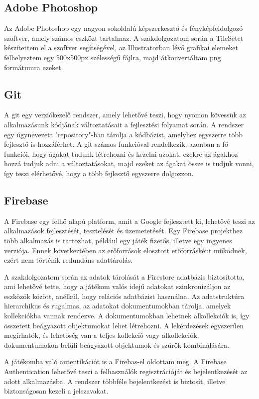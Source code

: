 \documentclass[12pt, a4paper]{report}
\theoremstyle{definition}
\begin{document}
	\subsection{Adobe Photoshop}
	Az Adobe Photoshop egy nagyon sokoldalú képszerkesztő és fényképfeldolgozó szoftver, amely számos eszközt tartalmaz. A szakdolgozatom során a TileSetet készítettem el a szoftver segítségével, az Illustratorban lévő grafikai elemeket felhelyeztem egy 500x500px szélességű fájlra, majd átkonvertáltam png formátumra ezeket.
	
	\subsection{Git}
	A git egy verziókezelő rendszer, amely lehetővé teszi, hogy nyomon kövessük az alkalmazásunk kódjának változtatásait a fejlesztési folyamat során. A rendszer egy úgynevezett "repository"-ban tárolja a kódbázist, amelyhez egyszerre több fejlesztő is hozzáférhet. A git számos funkcióval rendelkezik, azonban a fő funkciói, hogy ágakat tudunk létrehozni és kezelni azokat, ezekre az ágakhoz hozzá tudjuk adni a változtatásokat, majd ezeket az ágakat össze is tudjuk vonni, így teszi elérhetővé, hogy a több fejlesztő egyszerre dolgozzon. 
	
	\subsection{Firebase}
	A Firebase egy felhő alapú platform, amit a Google fejlesztett ki, lehetővé teszi az alkalmazások fejlesztését, tesztelését és üzemetetését. Egy Firebase projekthez több alkalmazás is tartozhat, például egy játék fizetős, illetve egy ingyenes verziója. Ennek következtében az erőforrások elosztott erőforrásként működnek, ezért nem történik redundáns adattárolás. 
	
	A szakdolgozatom során az adatok tárolását a Firestore adatbázis biztosította, ami lehetővé tette, hogy a játékom valós idejű adatokat szinkronizáljon az eszközök között, anélkül, hogy relációs adatbázist használna. Az adatstruktúra hierarchikus és rugalmas, az adatokat dokumentumokban tárolja, amelyek kollekciókba vannak rendezve. A dokumentumokban lehetnek alkollekciók is, így összetett beágyazott objektumokat lehet létrehozni. A lekérdezések egyszerűen megírhatók, és lehetőség van a teljes kollekció vagy alkollekciók, dokumentumokon belüli beágyazott objektumok és szűrők kombinálására.	
	
	A játékomba való autentikációt is a Firebas-el oldottam meg. A Firebase Authentication lehetővé teszi a felhasználók regisztrációját és bejelentkezését az adott alkalmazásba. A rendszer többféle bejelentkezést is biztosít, illetve biztonságosan kezeli a jelszavakat.
	
\end{document}
